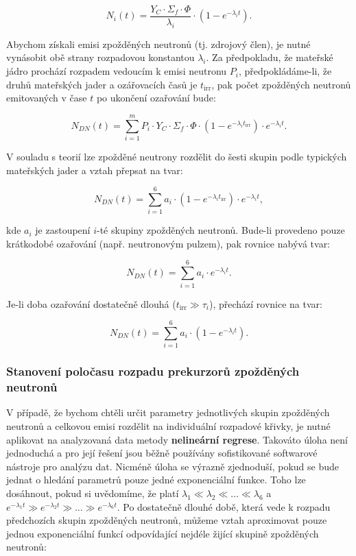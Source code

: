 \[
N_i(t) = \frac{Y_C \cdot \Sigma_f \cdot \Phi}{\lambda_i} \cdot \left(1 - e^{-\lambda_i t}\right).
\]

Abychom získali emisi zpožděných neutronů (tj. zdrojový člen), je nutné vynásobit obě strany rozpadovou konstantou $\lambda_i$. Za předpokladu, že mateřské jádro prochází rozpadem vedoucím k emisi neutronu $P_i$, předpokládáme-li, že druhů mateřských jader a ozářovacích časů je $t_\text{irr}$, pak počet zpožděných neutronů emitovaných v čase $t$ po ukončení ozařování bude:

\[
N_{DN}(t) = \sum_{i=1}^{m} P_i \cdot Y_C \cdot \Sigma_f \cdot \Phi \cdot (1 - e^{-\lambda_i t_\text{irr}}) \cdot e^{-\lambda_i t}.
\]

V souladu s teorií lze zpožděné neutrony rozdělit do šesti skupin podle typických mateřských jader a vztah přepsat na tvar:

\[
N_{DN}(t) = \sum_{i=1}^{6} a_i \cdot (1 - e^{-\lambda_i t_\text{irr}}) \cdot e^{-\lambda_i t},
\]

kde $a_i$ je zastoupení $i$-té skupiny zpožděných neutronů. Bude-li provedeno pouze krátkodobé ozařování (např. neutronovým pulzem), pak rovnice nabývá tvar:

\begin{equation}
    \boxed{N_{DN}(t) = \sum_{i=1}^{6} a_i \cdot e^{-\lambda_i t}.}
\end{equation}

Je-li doba ozařování dostatečně dlouhá ($t_\text{irr} \gg \tau_i$), přechází rovnice na tvar:

\begin{equation}
    \boxed{N_{DN}(t) = \sum_{i=1}^{6} a_i \cdot (1 - e^{-\lambda_i t}).}
\end{equation}

\subsubsection{Stanovení poločasu rozpadu prekurzorů zpožděných neutronů}

V případě, že bychom chtěli určit parametry jednotlivých skupin zpožděných neutronů a celkovou emisi rozdělit na individuální rozpadové křivky, je nutné aplikovat na analyzovaná data metody \textbf{nelineární regrese}. Takováto úloha není jednoduchá a pro její řešení jsou běžně používány sofistikované softwarové nástroje pro analýzu dat. Nicméně úloha se výrazně zjednoduší, pokud se bude jednat o hledání parametrů pouze jedné exponenciální funkce. Toho lze dosáhnout, pokud si uvědomíme, že platí $\lambda_1 \ll \lambda_2 \ll \dots \ll \lambda_6$ a $e^{-\lambda_1 t} \gg e^{-\lambda_2 t} \gg \dots \gg e^{-\lambda_6 t}$. Po dostatečně dlouhé době, která vede k rozpadu předchozích skupin zpožděných neutronů, můžeme vztah aproximovat pouze jednou exponenciální funkcí odpovídající nejdéle žijící skupině zpožděných neutronů:

